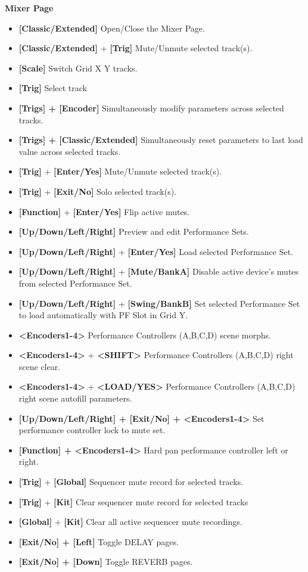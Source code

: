 \textbf{Mixer Page}
      \begin{itemize}
       \item \textbf{[Classic/Extended]} Open/Close the Mixer Page.
              \item \textbf{[Classic/Extended]} +  \textbf{[Trig]} Mute/Unmute selected track(s).
       \item \textbf{[Scale]} Switch Grid X Y tracks.
       \item \textbf{[Trig]} Select track
       \item \textbf{[Trigs] + [Encoder]} Simultaneously modify parameters across selected tracks. 
       \item \textbf{[Trigs] + [Classic/Extended]} Simultaneously reset parameters to last load value across selected tracks.
       \item \textbf{[Trig]} + \textbf{[Enter/Yes]} Mute/Unmute selected track(s).
      \item \textbf{[Trig]} + \textbf{[Exit/No]} Solo selected track(s).
      \item \textbf{[Function]} + \textbf{[Enter/Yes]} Flip active mutes.
      \item \textbf{[Up/Down/Left/Right]} Preview and edit Performance Sets.
      \item \textbf{[Up/Down/Left/Right]} + \textbf{[Enter/Yes]} Load selected Performance Set.
      \item \textbf{[Up/Down/Left/Right]} + \textbf{[Mute/BankA]} Disable active device's mutes from selected Performance Set.
      \item \textbf{[Up/Down/Left/Right]} + \textbf{[Swing/BankB]} Set selected Performance Set to load automatically with PF Slot in Grid Y.
      \item \textbf{<Encoders1-4>} Performance Controllers (A,B,C,D) scene morphs.
      \item \textbf{<Encoders1-4>} + \textbf{<SHIFT>} Performance Controllers (A,B,C,D) right scene clear.
      \item \textbf{<Encoders1-4>} + \textbf{<LOAD/YES>} Performance Controllers (A,B,C,D) right scene autofill parameters.   
      \item \textbf{[Up/Down/Left/Right] + [Exit/No] + <Encoders1-4>} Set performance controller lock to mute set.
      \item \textbf{[Function] + <Encoders1-4>} Hard pan performance controller left or right.
      \item \textbf{[Trig]} + \textbf{[Global]} Sequencer mute record for selected tracks.
      \item \textbf{[Trig]} + \textbf{[Kit]} Clear sequencer mute record for selected tracks
      \item \textbf{[Global]} + \textbf{[Kit]} Clear all active sequencer mute recordings.
      \item \textbf{[Exit/No] + [Left]} Toggle DELAY pages.
      \item \textbf{[Exit/No] + [Down]} Toggle REVERB pages.
       \end{itemize}
